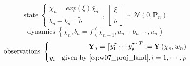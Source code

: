 \documentclass[10pt,twocolumn]{IEEEtran}
\begin{document}
\begin{equation}
    \label{eq:w07_state_final}
    \text{state } \left\{ 
        \begin{split}
            \chi_n=exp(\xi)\bar{\chi}_n\\
            b_n=\bar{b}_n+\tilde{b}
        \end{split} \,,\,\begin{bmatrix}
            \xi\\ \tilde{b}
        \end{bmatrix} \sim \mathcal{N}(0,\mathbf{P}_n)
     \right.
\end{equation}
\begin{equation}
    \label{eq:w07_dyn_final}
    \text{dynamics } \left\{ 
        \chi_n,b_n=f\left( \chi_{n-1},u_n-b_{n-1},n_n \right)
     \right.
\end{equation}
\begin{equation}
    \label{eq:w07_obs_final}
    \text{observations } \left\{ 
        \begin{split}
            \mathbf{Y}_n = \begin{bmatrix}
                y_1^T \cdots y_p^T
            \end{bmatrix}^T := \mathbf{Y}\left( \chi_n, w_n \right)\\
            y_i \quad \text{given by \eqref{eq:w07_proj_land}}, i=1,\cdots,p
        \end{split} 
    \right.
\end{equation}





\end{document}
